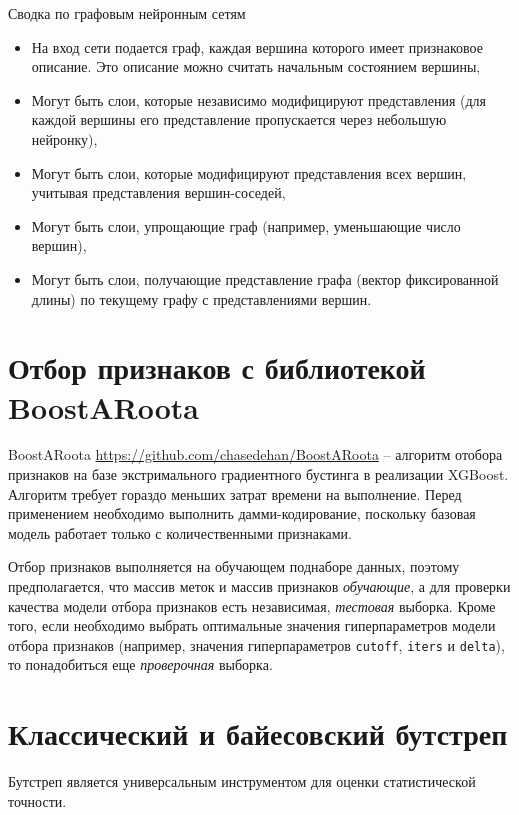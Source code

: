 \documentclass[%
	11pt,
	a4paper,
	utf8,
		]{article}
\begin{document}
Сводка по графовым нейронным сетям
\begin{itemize}
	\item На вход сети подается граф, каждая вершина которого имеет признаковое описание. Это описание можно считать начальным состоянием вершины,
	
	\item Могут быть слои, которые независимо модифицируют представления (для каждой вершины его представление пропускается через небольшую нейронку),
	
	\item Могут быть слои, которые модифицируют представления всех вершин, учитывая представления вершин-соседей,
	
	\item Могут быть слои, упрощающие граф (например, уменьшающие число вершин),
	
	\item Могут быть слои, получающие представление графа (вектор фиксированной длины) по текущему графу с представлениями вершин.
\end{itemize}



\section{Отбор признаков с библиотекой BoostARoota}

BoostARoota \url{https://github.com/chasedehan/BoostARoota} -- алгоритм отобора признаков на базе экстримального градиентного бустинга в реализации XGBoost. Алгоритм требует гораздо меньших затрат времени на выполнение. Перед применением необходимо выполнить дамми-кодирование, поскольку базовая модель работает только с количественными признаками.

Отбор признаков выполняется на обучающем поднаборе данных, поэтому предполагается, что массив меток и массив признаков \emph{обучающие}, а для проверки качества модели отбора признаков есть независимая, \emph{тестовая} выборка. Кроме того, если необходимо выбрать оптимальные значения гиперпараметров модели отбора признаков (например, значения гиперпараметров \texttt{cutoff}, \texttt{iters} и \texttt{delta}), то понадобиться еще \emph{проверочная} {выборка}.

\section{Классический и байесовский бутстреп}

Бутстреп является универсальным инструментом для оценки статистической точности. 
\end{document}
